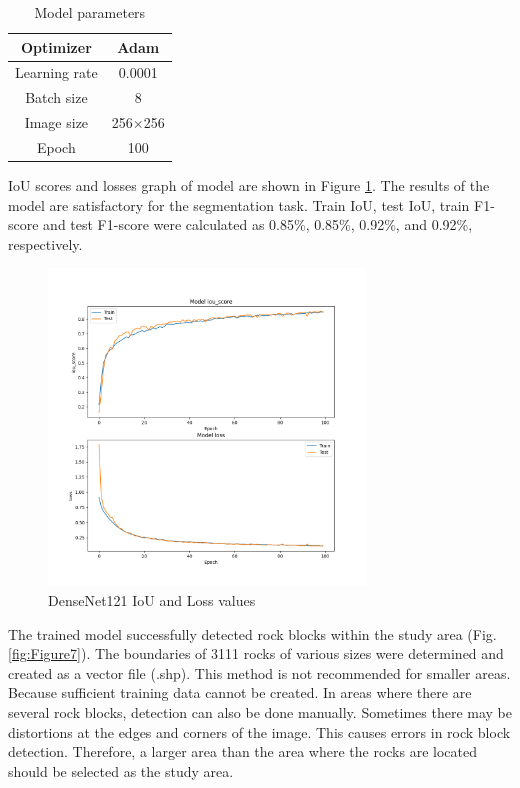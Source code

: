 \documentclass[a4paper,fleqn]{cas-sc}
\begin{document}
\begin{table}
	\centering
	\caption{Model parameters}
	\label{tab:Table1}
	\begin{tabular}{ |c|c|} 
		\hline
		Optimizer&Adam\\ 
		\hline 
		Learning rate&0.0001\\
		\hline
		Batch size&8\\
		\hline
		Image size&256$\times$256\\
		\hline
		Epoch&100\\
		\hline
	\end{tabular} 
\end{table}


IoU scores and losses graph of model are shown in Figure \ref{fig:Figure6}. The results of the model are satisfactory for the segmentation task. Train IoU, test IoU, train F1-score and test F1-score were calculated as 0.85\%, 0.85\%, 0.92\%, and 0.92\%, respectively.

\begin{figure}
	\centering
	\includegraphics[width=0.75\textwidth]{figures/fig6.png}
	\caption{DenseNet121 IoU and Loss values}
	\label{fig:Figure6}
\end{figure}

The trained model successfully detected rock blocks within the study area (Fig. \ref{fig:Figure7}). The boundaries of 3111 rocks of various sizes were determined and created as a vector file (.shp). This method is not recommended for smaller areas. Because sufficient training data cannot be created. In areas where there are several rock blocks, detection can also be done manually. 
Sometimes there may be distortions at the edges and corners of the image. This causes errors in rock block detection. Therefore, a larger area than the area where the rocks are located should be selected as the study area.
\end{document}
